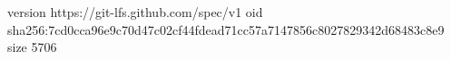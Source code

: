 version https://git-lfs.github.com/spec/v1
oid sha256:7cd0cca96e9c70d47c02cf44fdead71cc57a7147856c8027829342d68483c8e9
size 5706
